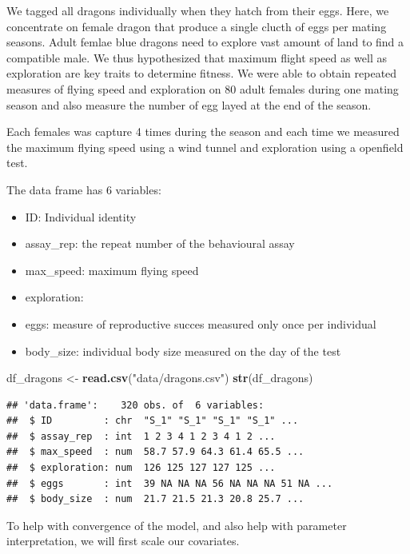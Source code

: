 \documentclass[
  12pt,
]{book}
\newenvironment{Shaded}{\begin{snugshade}}{\end{snugshade}}
\newcommand{\KeywordTok}[1]{\textcolor[rgb]{0.13,0.29,0.53}{\textbf{#1}}}
\newcommand{\NormalTok}[1]{#1}
\newcommand{\StringTok}[1]{\textcolor[rgb]{0.31,0.60,0.02}{#1}}
\providecommand{\tightlist}{%
  \setlength{\itemsep}{0pt}\setlength{\parskip}{0pt}}
\begin{document}
We tagged all dragons individually when they hatch from their eggs. Here, we concentrate on female dragon that produce a single clucth of eggs per mating seasons. Adult femlae blue dragons need to explore vast amount of land to find a compatible male. We thus hypothesized that maximum flight speed as well as exploration are key traits to determine fitness. We were able to obtain repeated measures of flying speed and exploration on 80 adult females during one mating season and also measure the number of egg layed at the end of the season.

Each females was capture 4 times during the season and each time we measured the maximum flying speed using a wind tunnel and exploration using a openfield test.

The data frame has 6 variables:

\begin{itemize}
\tightlist
\item
  ID: Individual identity
\item
  assay\_rep: the repeat number of the behavioural assay
\item
  max\_speed: maximum flying speed
\item
  exploration:
\item
  eggs: measure of reproductive succes measured only once per individual
\item
  body\_size: individual body size measured on the day of the test
\end{itemize}

\begin{Shaded}
\begin{Highlighting}[]
\NormalTok{df\_dragons \textless{}{-}}\StringTok{ }\KeywordTok{read.csv}\NormalTok{(}\StringTok{"data/dragons.csv"}\NormalTok{)}
\KeywordTok{str}\NormalTok{(df\_dragons)}
\end{Highlighting}
\end{Shaded}

\begin{verbatim}
## 'data.frame':    320 obs. of  6 variables:
##  $ ID         : chr  "S_1" "S_1" "S_1" "S_1" ...
##  $ assay_rep  : int  1 2 3 4 1 2 3 4 1 2 ...
##  $ max_speed  : num  58.7 57.9 64.3 61.4 65.5 ...
##  $ exploration: num  126 125 127 127 125 ...
##  $ eggs       : int  39 NA NA NA 56 NA NA NA 51 NA ...
##  $ body_size  : num  21.7 21.5 21.3 20.8 25.7 ...
\end{verbatim}

To help with convergence of the model, and also help with parameter interpretation, we will first scale our covariates.
\end{document}
